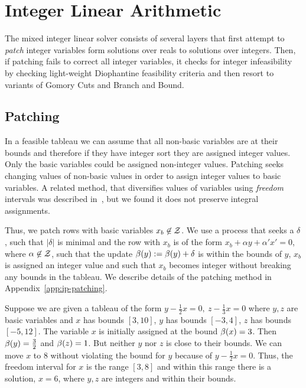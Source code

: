 \section{Integer Linear Arithmetic}
\label{sec:ip}

The mixed integer linear solver consists of several layers that first attempt to \emph{patch} integer variables
form solutions over reals to solutions over integers. Then, if patching fails to correct all integer variables,
it checks for integer infeasibility by checking light-weight Diophantine feasibility criteria and then resort to variants of
Gomory Cuts and Branch and Bound.


\subsection{Patching}


In a feasible tableau we can assume that all non-basic variables are at their bounds
and therefore if they have integer sort they are assigned integer values.
Only the basic variables could be assigned non-integer values.
Patching seeks changing values of non-basic values in order to assign integer values to basic variables.
A related method, that diversifies values of variables using \emph{freedom} intervals was
described in~\cite{MouraB08}, but we found it does not preserve integral assignments.

Thus, we patch rows with basic variables $x_b \not\in\mathcal{Z}$.
We use a process that seeks a $\delta$, such that $|\delta|$ is minimal
and the row with $x_b$ is of the form $x_b + \alpha y + \alpha'x' = 0$,
where $\alpha \not\in \mathcal{Z}$,
such that the update $\beta(y) := \beta(y) + \delta$ is within the bounds of $y$,
$x_b$ is assigned an integer value and such that $x_b$ becomes integer without 
breaking any bounds in the tableau.
We describe details of the patching method in Appendix~\ref{app:ip-patching}.


\begin{example}
  Suppose we are given a tableau of the form
  $
 y - \frac{1}{2} x = 0, \ 
 z - \frac{1}{3} x  = 0
$
where $y, z$ are basic variables and $x$ has bounds $[3,10]$, $y$ has bounds $[-3,4]$, $z$ has bounds $[-5,12]$.
The variable $x$ is initially assigned at the bound $\beta(x) = 3$. Then $\beta(y) = \frac{3}{2}$ and
$\beta(z) = 1$. But neither $y$ nor $z$ is close to their bounds. We can move $x$ to $8$
without violating the bound for $y$ because of $y - \frac{1}{2} x = 0$.
Thus, the freedom interval for $x$ is the range $[3,8]$ and within this range there is a solution,
$x = 6$, where $y, z$ are integers and within their bounds.
\end{example}



